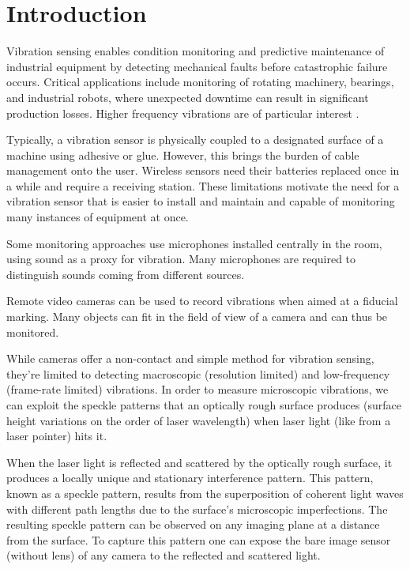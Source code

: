 \section{Introduction}
\label{sec:intro}

Vibration sensing enables condition monitoring and predictive maintenance of industrial equipment by detecting mechanical faults before catastrophic failure occurs. 
Critical applications include monitoring of rotating machinery, bearings, and industrial robots, where unexpected downtime can result in significant production losses. 
Higher frequency vibrations are of particular interest \cite{cm-highfreq}.

Typically, a vibration sensor is physically coupled to a designated surface of a machine using adhesive or glue. 
However, this brings the burden of cable management onto the user. Wireless sensors need their batteries replaced once in a while and require a receiving station. 
These limitations motivate the need for a vibration sensor that is easier to install and maintain and capable of monitoring many instances of equipment at once.

Some monitoring approaches use microphones installed centrally in the room, using sound as a proxy for vibration. 
Many microphones are required to distinguish sounds coming from different sources.

Remote video cameras can be used to record vibrations \cite{camvibration} when aimed at a fiducial marking. 
Many objects can fit in the field of view of a camera and can thus be monitored. 

While cameras offer a non-contact and simple method for vibration sensing, they're limited to detecting macroscopic (resolution limited) and low-frequency (frame-rate limited) vibrations.
In order to measure microscopic vibrations, we can exploit the speckle patterns that an optically rough surface produces (surface height variations on the order of laser wavelength) 
when laser light (like from a laser pointer) hits it.

When the laser light is reflected and scattered by the optically rough surface, it produces a locally unique and stationary interference pattern. 
This pattern, known as a speckle pattern, results from the superposition of coherent light waves with different path lengths due to the surface's microscopic imperfections. 
The resulting speckle pattern can be observed on any imaging plane at a distance from the surface. To capture this pattern one can expose the bare image sensor (without lens) 
of any camera to the reflected and scattered light.


